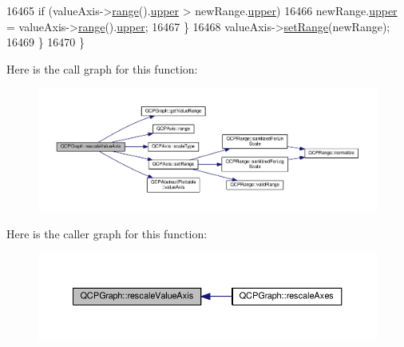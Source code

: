 \begin{DoxyCode}
16465       \textcolor{keywordflow}{if} (valueAxis->\hyperlink{class_q_c_p_axis_ab1ea79a4f5ea4cf42620f8f51c477ac4}{range}().\hyperlink{class_q_c_p_range_ae44eb3aafe1d0e2ed34b499b6d2e074f}{upper} > newRange.\hyperlink{class_q_c_p_range_ae44eb3aafe1d0e2ed34b499b6d2e074f}{upper})
16466         newRange.\hyperlink{class_q_c_p_range_ae44eb3aafe1d0e2ed34b499b6d2e074f}{upper} = valueAxis->\hyperlink{class_q_c_p_axis_ab1ea79a4f5ea4cf42620f8f51c477ac4}{range}().\hyperlink{class_q_c_p_range_ae44eb3aafe1d0e2ed34b499b6d2e074f}{upper};
16467     \}
16468     valueAxis->\hyperlink{class_q_c_p_axis_aebdfea5d44c3a0ad2b4700cd4d25b641}{setRange}(newRange);
16469   \}
16470 \}
\end{DoxyCode}


Here is the call graph for this function\+:\nopagebreak
\begin{figure}[H]
\begin{center}
\leavevmode
\includegraphics[width=350pt]{class_q_c_p_graph_a2ba0e1df416486d7e74299ef8cf68bba_cgraph}
\end{center}
\end{figure}




Here is the caller graph for this function\+:\nopagebreak
\begin{figure}[H]
\begin{center}
\leavevmode
\includegraphics[width=350pt]{class_q_c_p_graph_a2ba0e1df416486d7e74299ef8cf68bba_icgraph}
\end{center}
\end{figure}


\hypertarget{class_q_c_p_graph_ae0227c79f4e42a350c2c99fb2fb879db}{}
